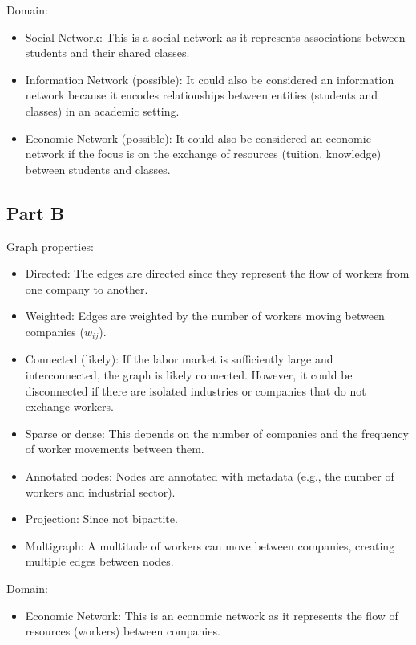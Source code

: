 \documentclass[12pt]{article}
\begin{document}
\noindent Domain:
\begin{itemize}
    \item Social Network: This is a social network as it represents associations between students and their shared classes.
    \item Information Network (possible): It could also be considered an information network because it encodes relationships between entities (students and classes) in an academic setting.
    \item Economic Network (possible): It could also be considered an economic network if the focus is on the exchange of resources (tuition, knowledge) between students and classes.
\end{itemize}


\subsection*{Part B}
Graph properties:
\begin{itemize}
    \item Directed: The edges are directed since they represent the flow of workers from one company to another.
    \item Weighted: Edges are weighted by the number of workers moving between companies (\(w_{ij}\)).
    \item Connected (likely): If the labor market is sufficiently large and interconnected, the graph is likely connected. However, it could be disconnected if there are isolated industries or companies that do not exchange workers.
    \item Sparse or dense: This depends on the number of companies and the frequency of worker movements between them.
    \item Annotated nodes: Nodes are annotated with metadata (e.g., the number of workers and industrial sector).
    \item Projection: Since not bipartite.
    \item Multigraph: A multitude of workers can move between companies, creating multiple edges between nodes.
\end{itemize}

\noindent Domain:
\begin{itemize}
    \item Economic Network: This is an economic network as it represents the flow of resources (workers) between companies.
\end{itemize}
\end{document}
